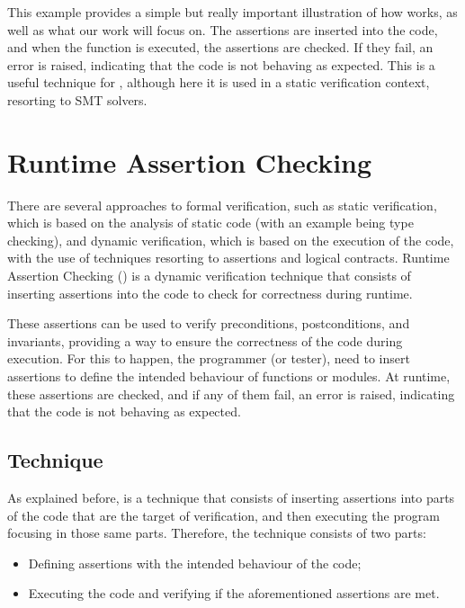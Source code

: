 
This example provides a simple but really important illustration of how \rac works, as well 
as what our work will focus on. The assertions are inserted into the code, and when the 
function is executed, the assertions are checked. If they fail, an error is raised, indicating 
that the code is not behaving as expected. This is a useful technique for \rac, although 
here it is used in a static verification context, resorting to SMT solvers.

\section{Runtime Assertion Checking}
\label{sec:rac}

There are several approaches to formal verification, such as static verification, 
which is based on the analysis of static code (with an example being type checking), and dynamic 
verification, which is based on the execution of the code, with the use of 
techniques resorting to assertions and logical contracts. Runtime Assertion Checking 
(\rac) is a dynamic verification technique that consists of inserting assertions 
into the code to check for correctness during runtime.

These assertions can be used to verify preconditions, postconditions, and invariants, 
providing a way to ensure the correctness of the code during execution. For this to 
happen, the programmer (or tester), need to insert assertions to define the intended 
behaviour of functions or modules. At runtime, these assertions are checked, and if 
any of them fail, an error is raised, indicating that the code is not behaving as 
expected.

\subsection{Technique}
\label{sub:technique}

As explained before, \rac is a technique that consists of inserting assertions into 
parts of the code that are the target of verification, and then executing the program 
focusing in those same parts. Therefore, the technique consists of two parts:

\begin{itemize}
    \item Defining assertions with the intended behaviour of the code;
    \item Executing the code and verifying if the aforementioned assertions are met.
\end{itemize}

